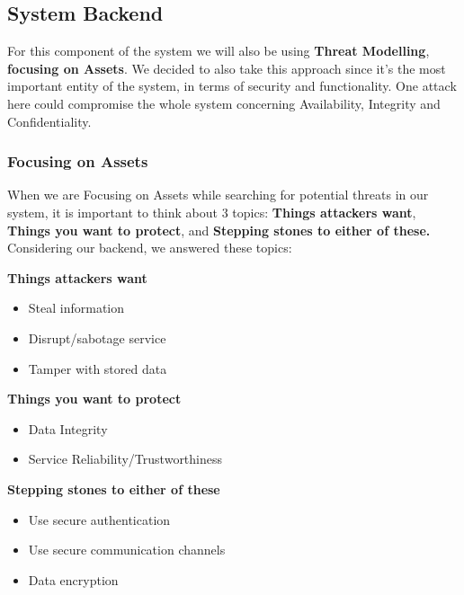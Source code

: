 
\subsection{System Backend}
For this component of the system we will also be using \textbf{Threat Modelling}, \textbf{focusing on Assets}. We decided to also take this approach since it's the most important entity of the system, in terms of security and functionality. One attack here could compromise the whole system concerning Availability, Integrity and Confidentiality.


\subsubsection{Focusing on Assets}

When we are Focusing on Assets while searching for potential threats in our system, it is important to think about 3 topics: \textbf{Things attackers want}, \textbf{Things you want to protect}, and \textbf{Stepping stones to either of these.} Considering our backend, we answered these topics:

\textbf{Things attackers want}
\begin{itemize}
    \item Steal information
    \item Disrupt/sabotage service
    \item Tamper with stored data
\end{itemize}

\textbf{Things you want to protect}
\begin{itemize}
    \item Data Integrity
    \item Service Reliability/Trustworthiness
\end{itemize}

\textbf{Stepping stones to either of these}
\begin{itemize}
    \item Use secure authentication
    \item Use secure communication channels
    \item Data encryption
\end{itemize}

